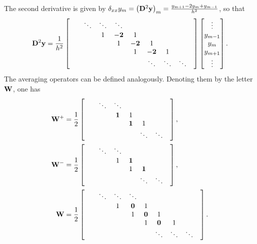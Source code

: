 The second derivative is given by $\delta_{xx} y_m = \left({\bf D}^2 {\bf y}\right)_m = \frac{y_{m+1} -2y_{m} + y_{m-1}}{h^2}$, so that
\begin{equation}
{\bf D}^2 {\bf y} = \frac{1}{h^2}\begin{bmatrix}
& & \ddots  & \ddots & \ddots & & & &\\ 
& & & 1 & {\bf -2} & 1 & & & &\\
& & & & 1 & {\bf -2 } & 1 &  & &\\
& & & & & 1 & {\bf -2 } & 1 &  & \\
& & & & & & \ddots & \ddots &  \ddots & \\
\end{bmatrix}
\begin{bmatrix}
\vdots \\
y_{m-1}\\
y_{m}\\
y_{m+1} \\
\vdots
\end{bmatrix}.
\end{equation}
The averaging operators can be defined analogously. Denoting them by the letter ${\bf W}$, one has
\begin{subequations}
\begin{align}
{\bf W}^+  &= \frac{1}{2}\begin{bmatrix}
& & {\bf \ddots}  & \ddots & & & \\ 
& & & {\bf 1} & 1 & & &\\
& & & & {\bf 1} & 1 & & \\
& & & & & \ddots & \ddots & \\
\end{bmatrix}, \\
{\bf W}^-  &= \frac{1}{2}\begin{bmatrix}
& & \ddots  & \ddots & & & \\ 
& & & 1 & {\bf 1} & & &\\
& & & & 1 & {\bf 1} & & \\
& & & & & \ddots & \ddots & \\
\end{bmatrix}, \\
{\bf W} &= \frac{1}{2 }\begin{bmatrix}
& & \ddots  & \ddots & \ddots & & & &\\ 
& & & 1 & {\bf 0} & 1 & & & &\\
& & & & 1 & {\bf 0 } & 1 &  & &\\
& & & & & 1 & {\bf 0 } & 1 &  & \\
& & & & & & \ddots & \ddots &  \ddots & \\
\end{bmatrix}.
\end{align}
\end{subequations}


